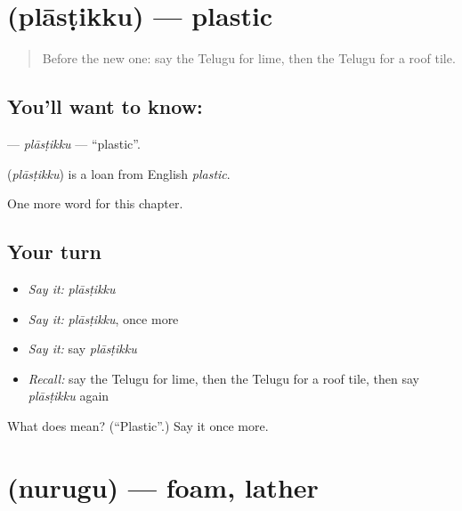 \section[\texorpdfstring{\te{ప్లాస్టిక్కు} (plāsṭikku)}{ప్లాస్టిక్కు (plāsṭikku)}]{ (plāsṭikku) — plastic}

\label{lesson:TE-C271-plastikku}



\begin{quote}
Before the new one: say the Telugu for lime, then the Telugu for a roof tile.
\end{quote}

\subsection*{You'll want to know: }
\textbf{} — \emph{plāsṭikku} — \textquotedblleft{}plastic\textquotedblright{}.

\begin{cousinweb}
\textbf{} (\emph{plāsṭikku}) is a loan from English \emph{plastic}.
\end{cousinweb}

\begin{grammarlens}[title={What you've built}]
One more word for this chapter.
\end{grammarlens}

\subsection*{Your turn}
\begin{itemize}
\raggedright
  \item \emph{Say it:} \emph{plāsṭikku}
  \item \emph{Say it:} \emph{plāsṭikku}, once more
  \item \emph{Say it:} say \emph{plāsṭikku}
  \item \emph{Recall:} say the Telugu for lime, then the Telugu for a roof tile, then say \emph{plāsṭikku} again
\end{itemize}

\begin{tcolorbox}[breakable,colback=teal!4,colframe=teal!35!black,title={Before you move on}]
What does  mean? (\textquotedblleft{}Plastic\textquotedblright{}.) Say it once more.
\end{tcolorbox}
\section[\texorpdfstring{\te{నురుగు} (nurugu)}{నురుగు (nurugu)}]{ (nurugu) — foam, lather}

